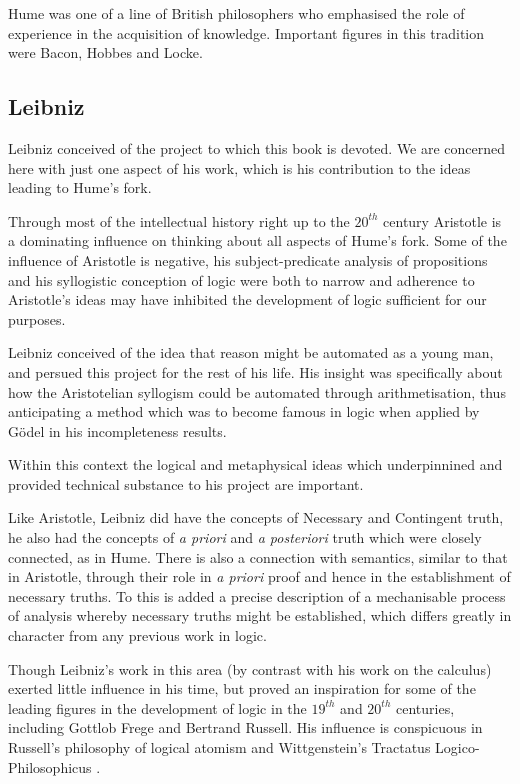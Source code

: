 Hume was one of a line of British philosophers who emphasised the role of experience in the acquisition of knowledge.
Important figures in this tradition were Bacon, Hobbes and Locke.

\subsection{Leibniz}

Leibniz conceived of the project to which this book is devoted.
We are concerned here with just one aspect of his work, which is his contribution to the ideas leading to Hume's fork.

Through most of the intellectual history right up to the $20^{th}$ century Aristotle is a dominating influence on thinking about all aspects of Hume's fork.
Some of the influence of Aristotle is negative, his subject-predicate analysis of propositions and his syllogistic conception of logic were both to narrow and adherence to Aristotle's ideas may have inhibited the development of logic sufficient for our purposes.

Leibniz conceived of the idea that reason might be automated as a young man, and persued this project for the rest of his life.
His insight was specifically about how the Aristotelian syllogism could be automated through arithmetisation, thus anticipating a method which was to become famous in logic when applied by G\"odel in his incompleteness results.

Within this context the logical and metaphysical ideas which underpinnined and provided technical substance to his project are important.

Like Aristotle, Leibniz did have the concepts of Necessary and Contingent truth, he also had the concepts of \emph{a priori} and \emph{a posteriori} truth which were closely connected, as in Hume.
There is also a connection with semantics, similar to that in Aristotle, through their role in \emph{a priori} proof and hence in the establishment of necessary truths.
To this is added a precise description of a mechanisable process of analysis whereby necessary truths might be established, which differs greatly in character from any previous work in logic.

Though Leibniz's work in this area (by contrast with his work on the calculus) exerted little influence in his time, but proved an inspiration for some of the leading figures in the development of logic in the $19^{th}$ and $20^{th}$ centuries, including Gottlob Frege and Bertrand Russell.
His influence is conspicuous in Russell's philosophy of logical atomism\cite{russellPLA} and Wittgenstein's Tractatus Logico-Philosophicus \cite{wittgensteinTLP}.

